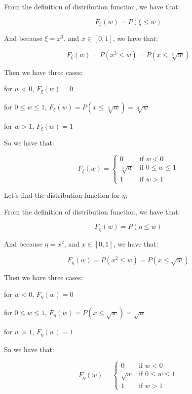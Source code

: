 From the definition of distribution function, we have that:

\begin{equation*}
    F_{\xi}(w) = P(\xi \leq w)
\end{equation*}

And because $\xi = x^3$, and $x \in [0,1]$, we have that:

\begin{equation*}
    F_{\xi}(w) = P(x^3 \leq w) = P(x \leq \sqrt[3]{w})
\end{equation*}

Then we have three cases:

for $w < 0$, $F_{\xi}(w) = 0$

for $0 \leq w \leq 1$, $F_{\xi}(w) = P(x \leq \sqrt[3]{w}) = \sqrt[3]{w}$

for $w > 1$, $F_{\xi}(w) = 1$

So we have that:

\begin{equation*}
    F_{\xi}(w) = \begin{cases}
        0           & \text{if } w < 0           \\
        \sqrt[3]{w} & \text{if } 0 \leq w \leq 1 \\
        1           & \text{if } w > 1
    \end{cases}
\end{equation*}

Let's find the distribution function for $\eta$:

From the definition of distribution function, we have that:

\begin{equation*}
    F_{\eta}(w) = P(\eta \leq w)
\end{equation*}

And because $\eta = x^2$, and $x \in [0,1]$, we have that:

\begin{equation*}
    F_{\eta}(w) = P(x^2 \leq w) = P(x \leq \sqrt{w})
\end{equation*}

Then we have three cases:

for $w < 0$, $F_{\eta}(w) = 0$

for $0 \leq w \leq 1$, $F_{\eta}(w) = P(x \leq \sqrt{w}) = \sqrt{w}$

for $w > 1$, $F_{\eta}(w) = 1$

So we have that:

\begin{equation*}
    F_{\eta}(w) = \begin{cases}
        0        & \text{if } w < 0           \\
        \sqrt{w} & \text{if } 0 \leq w \leq 1 \\
        1        & \text{if } w > 1
    \end{cases}
\end{equation*}

